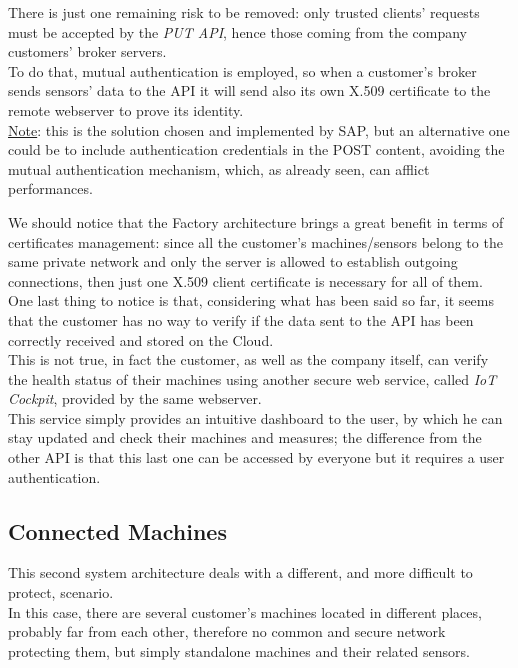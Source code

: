 \documentclass[12pt]{report}
\begin{document}
{There is just one remaining risk to be removed: only trusted clients' requests must be accepted by the \emph{PUT API}, hence those coming from the company customers' broker servers.\\
To do that, mutual authentication is employed, so when a customer's broker sends sensors' data to the API it will send also its own X.509 certificate to the remote webserver to prove its identity.\\
\underline{Note}: this is the solution chosen and implemented by SAP, but an alternative one could be to include authentication credentials in the POST content, avoiding the mutual authentication mechanism, which, as already seen, can afflict performances.

We should notice that the Factory architecture brings a great benefit in terms of certificates management: since all the customer's machines/sensors belong to the same private network and only the server is allowed to establish outgoing connections, then just one X.509 client certificate is necessary for all of them.\\

One last thing to notice is that, considering what has been said so far, it seems that the customer has no way to verify if the data sent to the API has been correctly received and stored on the Cloud.\\
This is not true, in fact the customer, as well as the company itself, can verify the health status of their machines using another secure web service, called \emph{IoT Cockpit}, provided by the same webserver.\\
This service simply provides an intuitive dashboard to the user, by which he can stay updated and check their machines and measures; the difference from the other API is that this last one can be accessed by everyone but it requires a user authentication.\\


\subsection{Connected Machines}
\label{ssec:connectedmachines}
\bigskip
This second system architecture deals with a different, and more difficult to protect, scenario.\\
In this case, there are several customer's machines located in different places, probably far from each other, therefore no common and secure network protecting them, but simply standalone machines and their related sensors.\\ 

}
\end{document}
